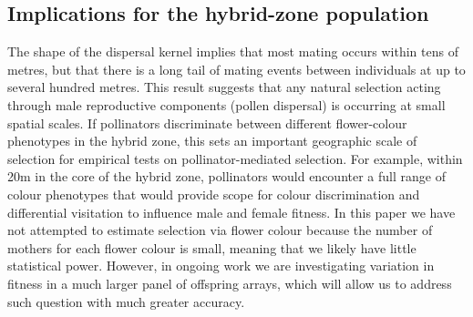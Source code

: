 \documentclass[10pt, a4paper, twocolumn]{article} %
\begin{document}

\subsection{Implications for the hybrid-zone population}

The shape of the dispersal kernel implies that most mating occurs within tens of metres, but that there is a long tail of mating events between individuals at up to several hundred metres. This result suggests that any natural selection acting through male reproductive components (pollen dispersal) is occurring at small spatial scales. If pollinators discriminate between different flower-colour phenotypes in the hybrid zone, this sets an important geographic scale of selection for empirical tests on pollinator-mediated selection. For example, within 20m in the core of the hybrid zone, pollinators would encounter a full range of colour phenotypes that would provide scope for colour discrimination and differential visitation to influence male and female fitness. In this paper we have not attempted to estimate selection via flower colour because the number of mothers for each flower colour is small, meaning that we likely have little statistical power. However, in ongoing work we are investigating variation in fitness in a much larger panel of offspring arrays, which will allow us to address such question with much greater accuracy.
\end{document}
